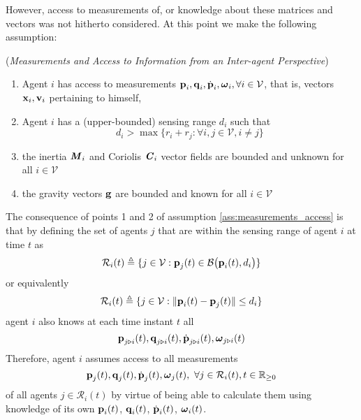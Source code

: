 
However, access to measurements of, or knowledge about these matrices and
vectors was not hitherto considered. At this point we make the following
assumption:

\begin{gg_box}
  \begin{assumption} (\textit{Measurements and Access to Information
    from an Inter-agent Perspective})
  \label{ass:measurements_access}
  \begin{enumerate}

    \item Agent $i$ has access to measurements
      $\bm{\mathbf{p}}_i, \bm{\mathbf{q}}_i, \dot{\bm{\mathbf{p}}}_i, \bm{\mathbf{\omega}}_i, \forall i\in\mathcal{V}$,
      that is, vectors $\bm{\mathbf{x}}_i, \bm{\mathbf{v}}_i$ pertaining to himself,

    \item Agent $i$ has a (upper-bounded) sensing range $d_i$ such that
      $$d_i > \max\{r_i + r_j : \forall i,j \in \mathcal{V}, i \neq j\}$$

    \item the inertia $\bm{\mathit{M}}_i$ and Coriolis $\bm{\mathit{C}}_i$ vector fields are
      bounded and unknown for all $i \in \mathcal{V}$

    \item the gravity vectors $\bm{\mathbf{g}}$ are bounded and known for all $i \in \mathcal{V}$

  \end{enumerate}
\end{assumption}
\end{gg_box}

The consequence of points 1 and 2 of assumption \eqref{ass:measurements_access}
is that by defining the set of agents $j$ that are within the sensing range
of agent $i$ at time $t$ as
$$\mathcal{R}_i(t) \triangleq \{j\in\mathcal{V} : \bm{\mathbf{p}}_j(t)\in\mathcal{B}\big(\bm{\mathbf{p}}_i(t), d_i\big)\}$$
or equivalently
$$\mathcal{R}_i(t) \triangleq \{j\in\mathcal{V} : \| \bm{\mathbf{p}}_i(t) - \bm{\mathbf{p}}_j(t) \| \leq d_i\}$$
agent $i$ also knows at each time instant $t$ all
$$\bm{\mathbf{p}}_{j \triangleright i}(t), \bm{\mathbf{q}}_{j \triangleright i}(t),
\dot{\bm{\mathbf{p}}}_{j \triangleright i}(t), \bm{\mathbf{\omega}}_{j \triangleright i}(t)$$
Therefore, agent $i$ assumes access to all measurements
$$\bm{\mathbf{p}}_{j}(t), \bm{\mathbf{q}}_{j}(t), \dot{\bm{\mathbf{p}}}_j(t),
\bm{\mathbf{\omega}}_j(t),\ \forall j\in \mathcal{R}_i(t),t\in\mathbb{R}_{\geq 0}$$
of all agents $j \in \mathcal{R}_i(t)$ by virtue of being able to calculate
them using knowledge of its own
$\bm{\mathbf{p}}_i(t)$, $\bm{\mathbf{q}}_i(t)$, $\dot{\bm{\mathbf{p}}}_i(t)$, $\bm{\mathbf{\omega}}_i(t)$.


